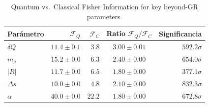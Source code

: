 \begin{table}[ht]
\centering
\caption{Quantum vs.\ Classical Fisher Information for key beyond-GR parameters.}
\begin{tabular}{lrrcr}
\toprule
Parámetro & $\mathcal{F}_Q$ & $\mathcal{F}_C$ & Ratio $\mathcal{F}_Q/\mathcal{F}_C$ & Significancia \\
\midrule
$δQ$ & $11.4\pm0.1$ & $3.8$ & $3.00\pm0.01$ & $592.2\sigma$ \\
$m_g$ & $15.2\pm0.0$ & $6.3$ & $2.40\pm0.00$ & $654.0\sigma$ \\
$|R|$ & $11.7\pm0.0$ & $6.5$ & $1.80\pm0.00$ & $377.1\sigma$ \\
$Δs$ & $10.0\pm0.0$ & $4.8$ & $2.10\pm0.00$ & $832.3\sigma$ \\
$α$ & $40.0\pm0.0$ & $22.2$ & $1.80\pm0.00$ & $672.8\sigma$ \\
\bottomrule
\end{tabular}
\end{table}